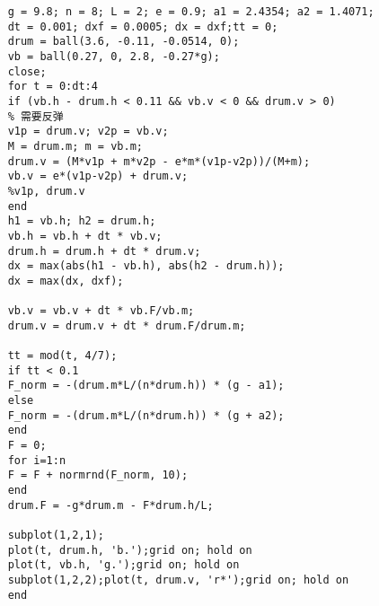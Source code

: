 \documentclass[withoutpreface,bwprint]{cumcmthesis} %
\begin{document}
\begin{lstlisting}
	g = 9.8; n = 8; L = 2; e = 0.9; a1 = 2.4354; a2 = 1.4071;
	dt = 0.001; dxf = 0.0005; dx = dxf;tt = 0;
	drum = ball(3.6, -0.11, -0.0514, 0);
	vb = ball(0.27, 0, 2.8, -0.27*g);
	close;
	for t = 0:dt:4
	if (vb.h - drum.h < 0.11 && vb.v < 0 && drum.v > 0) 
	% 需要反弹
	v1p = drum.v; v2p = vb.v;
	M = drum.m; m = vb.m;
	drum.v = (M*v1p + m*v2p - e*m*(v1p-v2p))/(M+m);
	vb.v = e*(v1p-v2p) + drum.v;
	%v1p, drum.v
	end
	h1 = vb.h; h2 = drum.h;
	vb.h = vb.h + dt * vb.v;
	drum.h = drum.h + dt * drum.v;
	dx = max(abs(h1 - vb.h), abs(h2 - drum.h));
	dx = max(dx, dxf);
	
	vb.v = vb.v + dt * vb.F/vb.m;
	drum.v = drum.v + dt * drum.F/drum.m;
	
	tt = mod(t, 4/7);
	if tt < 0.1
	F_norm = -(drum.m*L/(n*drum.h)) * (g - a1);
	else
	F_norm = -(drum.m*L/(n*drum.h)) * (g + a2);
	end
	F = 0;
	for i=1:n
	F = F + normrnd(F_norm, 10);
	end
	drum.F = -g*drum.m - F*drum.h/L;
	
	subplot(1,2,1);
	plot(t, drum.h, 'b.');grid on; hold on
	plot(t, vb.h, 'g.');grid on; hold on
	subplot(1,2,2);plot(t, drum.v, 'r*');grid on; hold on
	end

\end{lstlisting}
\end{document}
